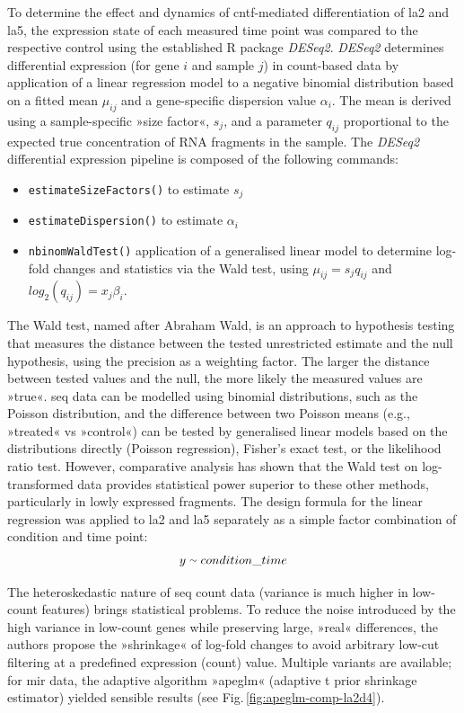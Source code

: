 \begin{method}
To determine the effect and dynamics of \ac{cntf}-mediated differentiation of \ac{la2} and \ac{la5}, the expression state of each measured time point was compared to the respective control using the established R package \textit{DESeq2}.\cite{Love2014} \textit{DESeq2} determines differential expression (for gene $i$ and sample $j$) in count-based data by application of a linear regression model to a negative binomial distribution based on a fitted mean $\mu_{ij}$ and a gene-specific dispersion value $\alpha_i$. The mean is derived using a sample-specific »size factor«, $s_j$, and a parameter $q_{ij}$ proportional to the expected true concentration of RNA fragments in the sample. The \textit{DESeq2} differential expression pipeline is composed of the following commands:
\begin{itemize}[noitemsep, leftmargin=.5cm, label={\tiny\raisebox{.5ex}{\textbullet}}]
\item \texttt{estimateSizeFactors()} to estimate $s_j$
\item \texttt{estimateDispersion()} to estimate $\alpha_i$
\item \texttt{nbinomWaldTest()} application of a generalised linear model to determine log-fold changes and statistics via the Wald test, using $\mu_{ij} = s_jq_{ij}$ and $log_2(q_{ij}) = x_j\beta_i$.
\end{itemize}
The Wald test, named after Abraham Wald,\cite{Wald1939} is an approach to hypothesis testing that measures the distance between the tested unrestricted estimate and the null hypothesis, using the precision as a weighting factor. The larger the distance between tested values and the null, the more likely the measured values are »true«. \ac{seq} data can be modelled using binomial distributions,\cite{Bullard2010} such as the Poisson distribution, and the difference between two Poisson means (e.g., »treated« vs »control«) can be tested by generalised linear models based on the distributions directly (Poisson regression), Fisher's exact test, or the likelihood ratio test. However, comparative analysis has shown that the Wald test on log-transformed data provides statistical power superior to these other methods,\cite{Chen2011} particularly in lowly expressed fragments. The design formula for the linear regression was applied to \ac{la2} and \ac{la5} separately as a simple factor combination of condition and time point: $$y \smallsim condition\_time$$

The heteroskedastic nature of \ac{seq} count data (variance is much higher in low-count features) brings statistical problems. To reduce the noise introduced by the high variance in low-count genes while preserving large, »real« differences, the authors propose the »shrinkage« of log-fold changes to avoid arbitrary low-cut filtering at a predefined expression (count) value. Multiple variants are available; for \ac{mir} data, the adaptive algorithm »apeglm«\cite{Zhu2019} (adaptive t prior shrinkage estimator) yielded sensible results (see Fig.\,\ref{fig:apeglm-comp-la2d4}).

\end{method}

